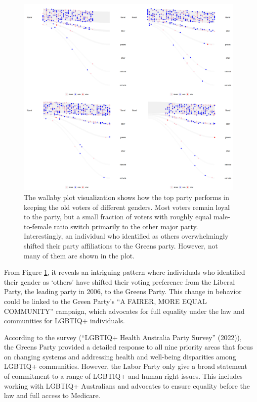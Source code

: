 \begin{figure}

{\centering \includegraphics[width=1\linewidth]{figures/animation-voter} 

}

\caption{The wallaby plot visualization shows how the top party performs in keeping the old voters of different genders. Most voters remain loyal to the party, but a small fraction of voters with roughly equal male-to-female ratio switch primarily to the other major party. Interestingly, an individual who identified as others overwhelmingly shifted their party affiliations to the Greens party. However, not many of them are shown in the plot.}\label{fig:voter-figure}
\end{figure}

From Figure \ref{fig:voter-figure}, it reveals an intriguing pattern where individuals who identified their gender as `others' have shifted their voting preference from the Liberal Party, the leading party in 2006, to the Greens Party. This change in behavior could be linked to the Green Party's ``A FAIRER, MORE EQUAL COMMUNITY'' campaign, which advocates for full equality under the law and communities for LGBTIQ+ individuals.

According to the survey ({``LGBTIQ+ Health Australia Party Survey''} (2022)), the Greens Party provided a detailed response to all nine priority areas that focus on changing systems and addressing health and well-being disparities among LGBTIQ+ communities. However, the Labor Party only give a broad statement of commitment to a range of LGBTIQ+ and human right issues. This includes working with LGBTIQ+ Australians and advocates to ensure equality before the law and full access to Medicare.

